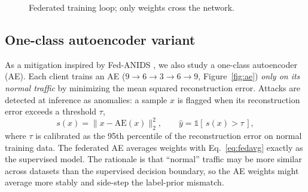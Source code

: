 \documentclass[11pt,a4paper]{article}
\begin{document}
\begin{figure}[htbp]
\centering
{}
\caption{Federated training loop; only weights cross the network.}
\label{alg:fed}
\end{figure}

\subsection{One-class autoencoder variant}
\label{sec:ocmethod}
As a mitigation inspired by Fed-ANIDS \cite{fedanids}, we also study a one-class
autoencoder (AE). Each client trains an AE (\(9\!\to\!6\!\to\!3\!\to\!6\!\to\!9\),
Figure~\ref{fig:ae}) \emph{only on its normal traffic} by minimizing the mean
squared reconstruction error. Attacks are detected at inference as anomalies: a
sample \(x\) is flagged when its reconstruction error exceeds a threshold
\(\tau\),
\begin{equation}
s(x) = \lVert x - \mathrm{AE}(x)\rVert_2^2, \qquad \hat{y} = \mathbb{1}[\,s(x) > \tau\,],
\end{equation}
where \(\tau\) is calibrated as the 95th percentile of the reconstruction error on
normal training data. The federated AE averages weights with Eq.~\ref{eq:fedavg}
exactly as the supervised model. The rationale is that ``normal'' traffic may be
more similar across datasets than the supervised decision boundary, so the AE
weights might average more stably and side-step the label-prior mismatch.
\end{document}
